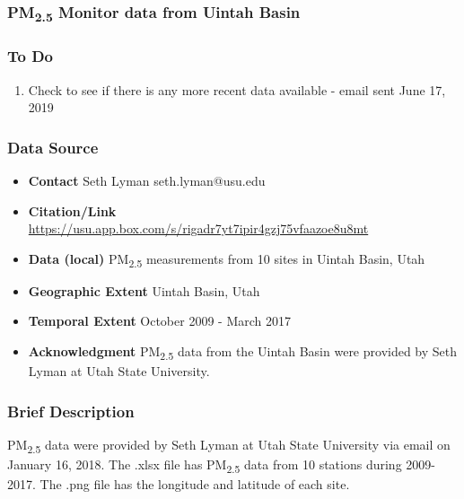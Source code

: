 \subsubsection{\texorpdfstring{PM\textsubscript{2.5}}{} Monitor data from Uintah Basin}

\subsubsection*{To Do}
\begin{enumerate}
\item Check to see if there is any more recent data available - email sent June 17, 2019
\end{enumerate}

\subsubsection*{Data Source}

\begin{itemize}[nolistsep]
\item \textbf{Contact} Seth Lyman seth.lyman@usu.edu
\item \textbf{Citation/Link}  \url{https://usu.app.box.com/s/rigadr7yt7ipir4gzj75vfaazoe8u8mt}
\item \textbf{Data (local)} PM\textsubscript{2.5} measurements from 10 sites in Uintah Basin, Utah
\item \textbf{Geographic Extent} Uintah Basin, Utah
\item \textbf{Temporal Extent} October 2009 - March 2017
\item \textbf{Acknowledgment} PM\textsubscript{2.5} data from the Uintah Basin were provided by Seth Lyman at Utah State University.
\end{itemize}

\subsubsection*{Brief Description}

PM\textsubscript{2.5} data were provided by Seth Lyman at Utah State University via email on January 16, 2018. The .xlsx file has PM\textsubscript{2.5} data from 10 stations during 2009-2017. The .png file has the longitude and latitude of each site. 

